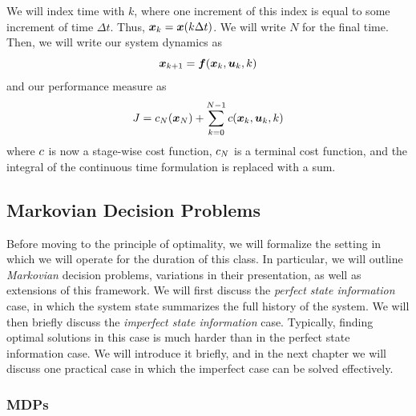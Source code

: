 We will index time with $k$, where one increment of this index is equal to some increment of time $\Delta t$. Thus, $\bm{x}_k = \bm{x}(k \Delta t)$. We will write $N$ for the final time. Then, we will write our system dynamics as 
\begin{equation}
    \bm{x}_{k+1} = \bm{f}(\bm{x}_k, \bm{u}_k, k)
\end{equation}
and our performance measure as 
\begin{equation}
    J = c_N(\bm{x}_N) + \sum_{k=0}^{N-1} c(\bm{x}_k, \bm{u}_k, k)
\end{equation}
where $c$ is now a stage-wise cost function, $c_N$ is a terminal cost function, and the integral of the continuous time formulation is replaced with a sum. 

\subsection{Markovian Decision Problems}

Before moving to the principle of optimality, we will formalize the setting in which we will operate for the duration of this class. In particular, we will outline \textit{Markovian} decision problems, variations in their presentation, as well as extensions of this framework. We will first discuss the \textit{perfect state information} case, in which the system state summarizes the full history of the system. We will then briefly discuss the \textit{imperfect state information} case. Typically, finding optimal solutions in this case is much harder than in the perfect state information case. We will introduce it briefly, and in the next chapter we will discuss one practical case in which the imperfect case can be solved effectively. 

\subsubsection{MDPs}

